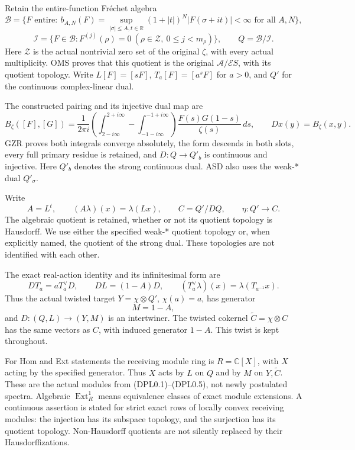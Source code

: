 Retain the entire-function Fréchet algebra \[
\mathcal B=\{F\text{ entire}:\
b_{A,N}(F)=\sup_{|\sigma|\le A,t\in\mathbb R}
(1+|t|)^N|F(\sigma+it)|<\infty\text{ for all }A,N\},
\] \[
\mathcal I=\{F\in\mathcal B:F^{(j)}(\rho)=0\
(\rho\in\mathscr Z,\ 0\le j<m_\rho)\},\qquad Q=\mathcal B/\mathcal I.
\tag{DPL0.1}
\] Here \(\mathscr Z\) is the actual nontrivial zero set of the original
\(\zeta\), with every actual multiplicity. OMS proves that this quotient
is the original \(\mathcal A/\mathcal ES\), with its quotient topology.
Write \(L[F]=[sF]\), \(T_a[F]=[a^sF]\) for \(a>0\), and \(Q'\) for the
continuous complex-linear dual.

The constructed pairing and its injective dual map are \[
B_\zeta([F],[G])=
\frac1{2\pi i}\left(\int_{2-i\infty}^{2+i\infty}
-\int_{-1-i\infty}^{-1+i\infty}\right)
\frac{F(s)G(1-s)}{\zeta(s)}\,ds,\qquad
D x(y)=B_\zeta(x,y).
\tag{DPL0.2}
\] GZR proves both integrals converge absolutely, the form descends in
both slots, every full primary residue is retained, and \(D:Q\to Q'_b\)
is continuous and injective. Here \(Q'_b\) denotes the strong continuous
dual. ASD also uses the weak-* dual \(Q'_\sigma\).

Write \[
A=L^t,\qquad (A\lambda)(x)=\lambda(Lx),\qquad
C=Q'/DQ,\qquad \eta:Q'\to C.
\tag{DPL0.3}
\] The algebraic quotient is retained, whether or not its quotient
topology is Hausdorff. We use either the specified weak-* quotient
topology or, when explicitly named, the quotient of the strong dual.
These topologies are not identified with each other.

The exact real-action identity and its infinitesimal form are \[
DT_a=aT_a^\vee D,\qquad
DL=(1-A)D,\qquad
(T_a^\vee\lambda)(x)=\lambda(T_{a^{-1}}x).
\tag{DPL0.4}
\] Thus the actual twisted target \(Y=\chi\otimes Q'\), \(\chi(a)=a\),
has generator \[
M=1-A,
\tag{DPL0.5}
\] and \(D:(Q,L)\to(Y,M)\) is an intertwiner. The twisted cokernel
\(\widetilde C=\chi\otimes C\) has the same vectors as \(C\), with
induced generator \(1-A\). This twist is kept throughout.

For Hom and Ext statements the receiving module ring is
\(R=\mathbb C[X]\), with \(X\) acting by the specified generator. Thus
\(X\) acts by \(L\) on \(Q\) and by \(M\) on \(Y,\widetilde C\). These
are the actual modules from (DPL0.1)--(DPL0.5), not newly postulated
spectra. Algebraic \(\operatorname{Ext}^1_R\) means equivalence classes
of exact module extensions. A continuous assertion is stated for strict
exact rows of locally convex receiving modules: the injection has its
subspace topology, and the surjection has its quotient topology.
Non-Hausdorff quotients are not silently replaced by their
Hausdorffizations.

